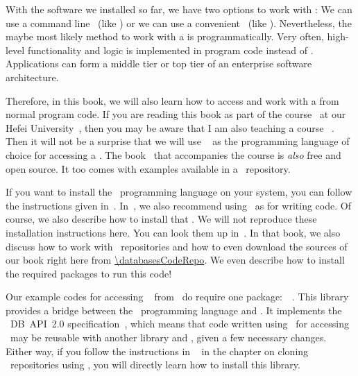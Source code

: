 %
%
With the software we installed so far, we have two options to work with :
We can use a command line ~(like \psql) or we can use a convenient ~(like \libreofficeBase).
Nevertheless, the maybe most likely method to work with a  is programmatically.
Very often, high-level functionality and logic is implemented in program code instead of \sql.
Applications can form a middle tier or top tier of an enterprise software architecture.

Therefore, in this book, we will also learn how to access and work with a  from normal program code.
If you are reading this book as part of the  course~\cite{databases} at our Hefei University~, then you may be aware that I am also teaching a course ~\cite{programmingWithPython}.
Then it will not be a surprise that we will use \python~\cite{H2023ABGTP3P,LH2015DSAAWP,programmingWithPython} as the programming language of choice for accessing a .
The book~\cite{programmingWithPython} that accompanies the  course is \emph{also} free and open source.
It too comes with examples available in a \github\ repository.

If you want to install the \python\ programming language on your system, you can follow the instructions given in~\cite{programmingWithPython}.
In~\cite{programmingWithPython}, we also recommend using \pycharm\ as  for writing code.
Of course, we also describe how to install that .
We will not reproduce these installation instructions here.
You can look them up in~\cite{programmingWithPython}.
In that book, we also discuss how to work with \git\ repositories and how to even download the sources of our book right here from \url{\databasesCodeRepo}.
We even describe how to install the required packages to run this code!%
%
\begin{sloppypar}%
Our example codes for accessing \postgresql\  from \python\ do require one package:~\psycopg~\cite{VDGE2010P}.
This library provides a bridge between the \python\ programming language and \postgresql.
It implements the \python~\acrshort{DB}~\acrshort{API}~2.0 specification~\cite{PEP249}, which means that code written using \psycopg\ for accessing \postgresql\ may be reusable with another library and , given a few necessary changes.
Either way, if you follow the instructions in ~\cite{programmingWithPython} in the chapter on cloning \git~repositories using \pycharm, you will directly learn how to install this library.%
\end{sloppypar}%
%
%
%
\endhsection%
